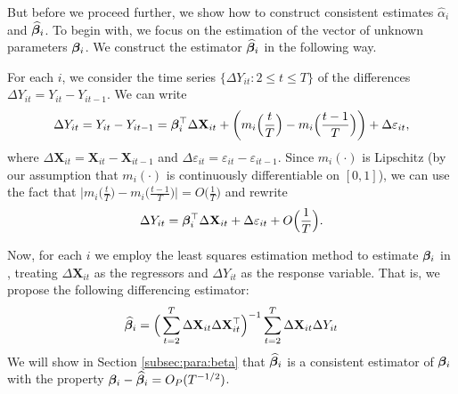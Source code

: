 \documentclass[a4paper,12pt]{article}
\makeatletter
\renewcommand{\eqref}[1]{\tagform@{\ref{#1}}}
\makeatother
\begin{document}
But before we proceed further, we show how to construct consistent estimates $\widehat{\alpha}_i$ and $\widehat{\bm{\beta}}_i$. To begin with, we focus on the estimation of the vector of unknown parameters $\bm{\beta}_i$. We construct the estimator  $\widehat{\bm{\beta}}_i$ in the following way.

For each $i$, we consider the time series $\{\Delta Y_{it}: 2 \leq t \leq T\}$ of the differences \linebreak $\Delta Y_{it} = Y_{it} - Y_{i t-1}$. We can write
\begin{align*}
	\Delta Y_{it} = Y_{it} - Y_{i t-1} =\bm{\beta}_i^\top \Delta \mathbf{X}_{it} + \bigg(m_i \Big( \frac{t}{T} \Big) - m_i \Big(\frac{t-1}{T}\Big)\bigg) + \Delta \varepsilon_{it},
\end{align*}
where $\Delta  \mathbf{X}_{it} =  \mathbf{X}_{it} -  \mathbf{X}_{it-1}$ and $ \Delta \varepsilon_{it} = \varepsilon_{it} - \varepsilon_{i t-1}$. Since $m_i(\cdot)$ is Lipschitz (by our assumption that $m_i(\cdot)$ is continuously differentiable on $[0, 1]$), we can use the fact that $ \big|m_i \big( \frac{t}{T} \big) - m_i \big(\frac{t-1}{T}\big) \big| = O\big(\frac{1}{T}\big)$ and rewrite 
\begin{align}\label{model_with_regs}
	\Delta Y_{it} = \bm{\beta}_i^\top \Delta \mathbf{X}_{it} + \Delta \varepsilon_{it} + O\Big(\frac{1}{T}\Big).
\end{align}

Now, for each $i$ we employ the least squares estimation method to estimate $\bm{\beta}_i$ in \eqref{model_with_regs}, treating $\Delta \mathbf{X}_{it}$ as the regressors and $\Delta Y_{it}$ as the response variable. That is, we propose the following differencing estimator:
\begin{align}\label{eq:beta:est}
\widehat{\bm{\beta}}_i = \Big( \sum_{t=2}^T \Delta \mathbf{X}_{it} \Delta \mathbf{X}_{it}^\top \Big)^{-1} \sum_{t=2}^T \Delta \mathbf{X}_{it} \Delta Y_{it}
\end{align}
We will show in Section \ref{subsec:para:beta} that $\widehat{\bm{\beta}}_i$ is a consistent estimator of $\bm{\beta}_i$ with the property $\bm{\beta}_i - \widehat{\bm{\beta}}_i = O_P(T^{-1/2})$.
\end{document}
